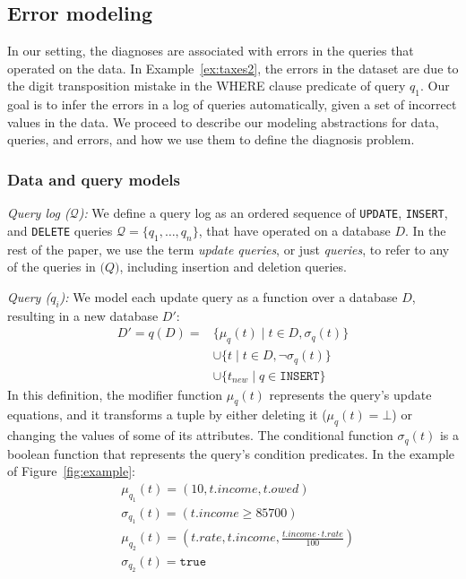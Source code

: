 

\subsection{Error modeling}
\label{sec:model}

In our setting, the diagnoses are associated with errors in the queries that
operated on the data. In Example~\ref{ex:taxes2}, the errors in the dataset
are due to the digit transposition mistake in the WHERE clause predicate of
query $q_1$. Our goal is to infer the errors in a log of queries
automatically, given a set of incorrect values in the data. We proceed to
describe our modeling abstractions for data, queries, and errors, and how we
use them to define the diagnosis problem.

\subsubsection*{Data and query models}

\noindent
\emph{Query log ($\mathcal{Q}$):}
We define a query log as an ordered sequence of \texttt{UPDATE}, \texttt{INSERT}, and
\texttt{DELETE} queries $\mathcal{Q}=\{q_1,\dots,q_n\}$, that have
operated on a database $D$. In the rest of the paper, we use the term
\emph{update queries}, or just \emph{queries}, to refer to any of the queries in $\mathcal(Q)$,
including insertion and deletion queries.

\smallskip
\noindent
\emph{Query ($q_i$):}  We model each update query as a function over a database $D$, resulting in a new database $D'$:  
\begin{align*}
    D'=q(D)= &\{\mu_{q}(t)\;|\;t\in D, \sigma_{q}(t)\}\\
    &\cup\{t\;|\;t\in D, \neg\sigma_{q}(t)\}\\
    &\cup\{t_{new}\;|\;q\in\texttt{INSERT}\}
\end{align*}
% 
In this definition, the modifier function $\mu_q(t)$ represents the query's update equations, and it transforms a tuple by either deleting it ($\mu_q(t)=\bot$) or changing the values of some of its attributes.
The conditional function $\sigma_q(t)$ is a boolean function that represents the query's condition predicates.  In the example of Figure~\ref{fig:example}:
\begin{align*}
    &\mu_{q_1}(t)=(10, t.income, t.owed)\\
    &\sigma_{q_1}(t)=(t.income\ge 85700)\\
    &\mu_{q_2}(t)=(t.rate, t.income, \frac{t.income\cdot t.rate}{100})\\
    &\sigma_{q_2}(t)=\texttt{true}
\end{align*} 

